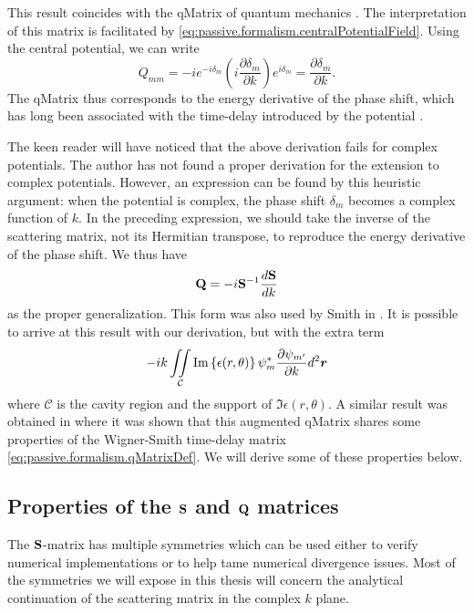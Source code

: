 This result coincides with the \gls{qMatrix} of quantum 
mechanics \cite{SMI1960}. The interpretation of this 
matrix is facilitated by \eqref{eq:passive.formalism.centralPotentialField}. 
Using the central potential, we can write
  \begin{equation}
    Q_{mm} = -ie^{-i\delta_m}\left(i\frac{\partial\delta_m}{\partial k}\right)e^{i\delta_m} = \frac{\partial\delta_m}{\partial k}.
  \end{equation}
The \gls{qMatrix} thus corresponds to the energy derivative of the 
phase shift, which has long been associated with the time-delay
introduced by the potential \cite{EIS1948,SMI1960,CAR2002}. 

The keen reader will have noticed that the above derivation
fails for complex potentials. The author has not found a proper
derivation for the extension to complex potentials. However, 
an expression can be found by this heuristic argument:
when the potential is complex, the phase shift $\delta_m$
becomes a complex function of $k$. In the preceding expression, 
we should take the inverse of the scattering matrix, not its Hermitian
transpose, to reproduce the energy derivative of the phase shift.
We thus have
  \begin{equation}
   \mathbf{Q} = -i\mathbf{S}^{-1}\frac{d\mathbf{S}}{dk}
  \end{equation}
as the proper generalization. This form was also used by Smith in
\cite{SMI1960}.
It is possible to arrive at this result with our derivation, but
with the extra term
	\begin{equation}
		-ik\mathop{\iint}_\mathcal{C}\text{Im}\left\{\epsilon(r,\theta)\right\}\psi_m^*\frac{\partial\psi_{m'}}{\partial k}d^2\boldsymbol{r}
	\end{equation}
where $\mathcal{C}$ is the cavity region and the support of 
$\Im{\epsilon(r,\theta)}$. A similar result was obtained in 
\cite{MAR1975} where it was shown that this augmented \gls{qMatrix}
shares some properties of the Wigner-Smith time-delay matrix 
\eqref{eq:passive.formalism.qMatrixDef}. We will derive some of
these properties below. 

\subsection{Properties of the $\mathbf{S}$ and $\mathbf{Q}$ matrices}
The $\mathbf{S}$-matrix has multiple symmetries which can be used 
either to verify numerical implementations or to help tame 
numerical divergence issues. Most of the symmetries we will
expose in this thesis will concern the analytical continuation
of the scattering matrix in the complex $k$ plane. 

